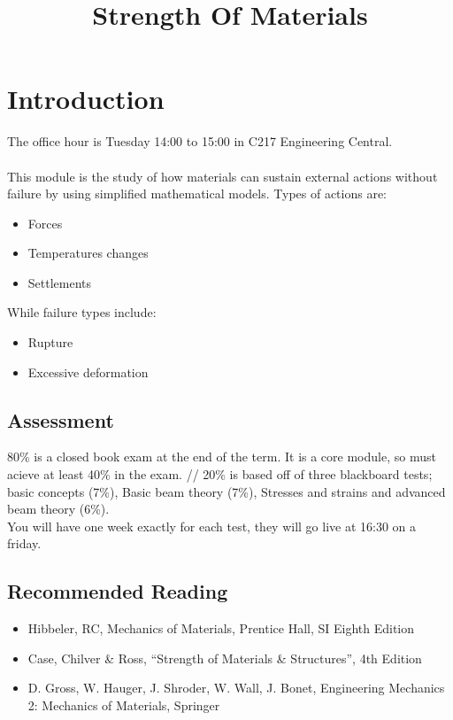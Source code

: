 \documentclass[12pt,a4paper]{article}
\begin{document}
\title{Strength Of Materials}
\date{}
\maketitle

\newpage

\tableofcontents

\newpage

\section{Introduction}
    The office hour is Tuesday 14:00 to 15:00 in C217 Engineering Central. \\
    \\
    This module is the study of how materials can sustain external actions without failure by using simplified mathematical models. Types of actions are:
    \begin{itemize}
        \item Forces
        \item Temperatures changes
        \item Settlements
    \end{itemize}
    While failure types include:
    \begin{itemize}
        \item Rupture
        \item Excessive deformation
    \end{itemize}

    \subsection{Assessment}
        80\% is a closed book exam at the end of the term. It is a core module, so must acieve at least 40\% in the exam. //
        20\% is based off of three blackboard tests; basic concepts (7\%), Basic beam theory (7\%), Stresses and strains and advanced beam theory (6\%). \\
        You will have one week exactly for each test, they will go live at 16:30 on a friday.

    \subsection{Recommended Reading}
        \begin{itemize}
            \item Hibbeler, RC, Mechanics of Materials, Prentice Hall, SI Eighth Edition
            \item Case, Chilver \& Ross, “Strength of Materials \& Structures”, 4th Edition
            \item D. Gross, W. Hauger, J. Shroder, W. Wall, J. Bonet, Engineering Mechanics 2: Mechanics of Materials, Springer
        \end{itemize}
\end{document}
